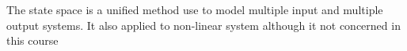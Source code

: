 The state space is a unified method use to model multiple input and multiple output systems. It also applied to non-linear system although it not concerned in this course
